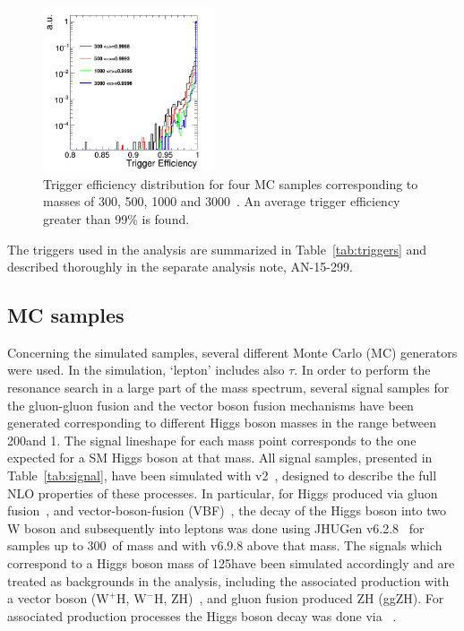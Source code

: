 \begin{figure}[htbp]
\centering
 \includegraphics[width=0.45\textwidth]{Figs/Trigger/triggW.png}
\caption{
      Trigger efficiency distribution for 
      four MC samples corresponding to masses of 300, 500, 1000 and 3000~\GeV.
      An average trigger efficiency greater than 99\% is found.
     }
    \label{Fig:triggerIntegral}
\end{figure}




The triggers used in the analysis are summarized in Table~\ref{tab:triggers} and 
described thoroughly in the separate analysis note, AN-15-299.



\subsection{MC samples}
Concerning the simulated samples, several different Monte Carlo (MC) generators were used. 
In the simulation, `lepton' includes also $\tau$.
In order to perform the resonance search in a large part of the mass spectrum, several signal samples for the gluon-gluon fusion and the vector boson fusion mechanisms have been generated corresponding to different Higgs boson masses in the range between 200\GeV and 1\TeV. The signal lineshape for each mass point corresponds to the one expected for a SM Higgs boson at that mass.
All signal samples, presented in Table~\ref{tab:signal}, have been simulated with
\POWHEG v2~\cite{Nason:2004rx,Frixione:2007vw,Alioli:2010xd}, designed to describe the full NLO properties of these processes.
In particular, for Higgs produced via gluon fusion~\cite{Alioli:2008tz}, and vector-boson-fusion (VBF)~\cite{Nason:2009ai},
the decay of the Higgs boson into two W boson and subsequently into leptons
was done using JHUGen v6.2.8~\cite{jhugen} for samples up to 300~\GeV of mass
and with v6.9.8 above that mass.
The signals which correspond to a Higgs boson mass of 125\GeV have been simulated accordingly and are treated as backgrounds in the analysis, including the associated production with a vector boson ($\mathrm{W^{+}H}$, $\mathrm{W^{-}H}$, ZH)~\cite{Luisoni:2013kna}, and gluon fusion produced ZH (ggZH). For associated production processes the Higgs boson decay was done via ~\cite{Sjostrand:2007gs}.



